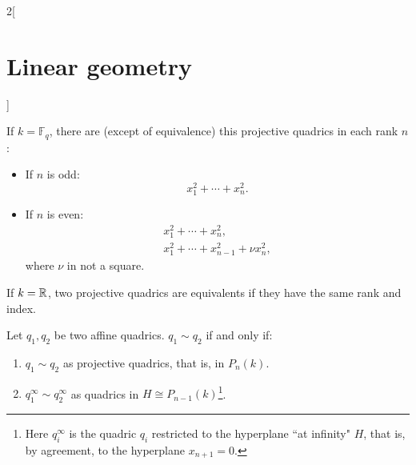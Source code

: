 \documentclass[../../../main.tex]{subfiles}
\begin{document}
\begin{multicols}{2}[\section{Linear geometry}]
\begin{theorem}
If $k=\mathbb{F}_q$, there are (except of equivalence) this projective quadrics in each rank $n$:
\begin{itemize}
    \item If $n$ is odd: $$\displaystyle x_1^2+\cdots+ x_n^2.$$
    \item If $n$ is even: \begin{gather*}
    x_1^2+\cdots+ x_n^2,\\
    x_1^2+\cdots+ x_{n-1}^2+\nu x_n^2,
\end{gather*}
where $\nu$ in not a square.
\end{itemize}
\end{theorem}
\begin{theorem}
If $k=\mathbb{R} $, two projective quadrics are equivalents if they have the same rank and index.
\end{theorem}
\begin{theorem}
Let $q_1,q_2$ be two affine quadrics. $q_1\sim q_2$ if and only if:
\begin{enumerate}
    \item $q_1\sim q_2$ as projective quadrics, that is, in $P_n(k)$.
    \item $q_1^\infty\sim q_2^\infty$ as quadrics in $H\cong P_{n-1}(k)$\footnote{Here $q_i^\infty$ is the quadric $q_i$ restricted to the hyperplane ``at infinity" $H$, that is, by agreement, to the hyperplane $x_{n+1}=0$.}.
\end{enumerate}
\end{theorem}
\end{multicols}
\end{document}
